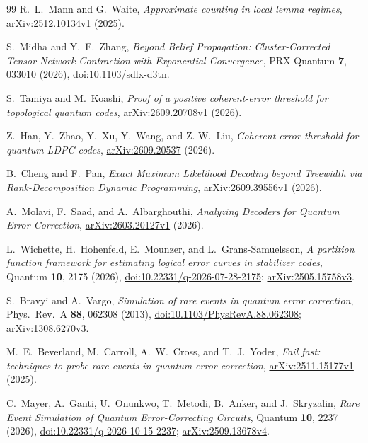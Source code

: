 \documentclass[10pt,twocolumn]{article}
\theoremstyle{definition}
\begin{document}
\begin{thebibliography}{99}
R.~L.~Mann and G.~Waite,
\emph{Approximate counting in local lemma regimes},
\href{https://arxiv.org/abs/2512.10134v1}{arXiv:2512.10134v1} (2025).

S.~Midha and Y.~F.~Zhang,
\emph{Beyond Belief Propagation: Cluster-Corrected Tensor Network Contraction
with Exponential Convergence}, PRX Quantum \textbf{7}, 033010 (2026),
\href{https://doi.org/10.1103/sdlx-d3tn}{doi:10.1103/sdlx-d3tn}.

S.~Tamiya and M.~Koashi,
\emph{Proof of a positive coherent-error threshold for topological quantum codes},
\href{https://arxiv.org/abs/2609.20708v1}{arXiv:2609.20708v1} (2026).

Z.~Han, Y.~Zhao, Y.~Xu, Y.~Wang, and Z.-W.~Liu,
\emph{Coherent error threshold for quantum LDPC codes},
\href{https://arxiv.org/abs/2609.20537}{arXiv:2609.20537} (2026).

B.~Cheng and F.~Pan,
\emph{Exact Maximum Likelihood Decoding beyond Treewidth via
Rank-Decomposition Dynamic Programming},
\href{https://arxiv.org/abs/2609.39556v1}{arXiv:2609.39556v1} (2026).

A.~Molavi, F.~Saad, and A.~Albarghouthi,
\emph{Analyzing Decoders for Quantum Error Correction},
\href{https://arxiv.org/abs/2603.20127v1}{arXiv:2603.20127v1} (2026).

L.~Wichette, H.~Hohenfeld, E.~Mounzer, and L.~Grans-Samuelsson,
\emph{A partition function framework for estimating logical error curves
in stabilizer codes},
Quantum \textbf{10}, 2175 (2026),
\href{https://doi.org/10.22331/q-2026-07-28-2175}{doi:10.22331/q-2026-07-28-2175};
\href{https://arxiv.org/abs/2505.15758v3}{arXiv:2505.15758v3}.

S.~Bravyi and A.~Vargo,
\emph{Simulation of rare events in quantum error correction},
Phys.\ Rev.\ A \textbf{88}, 062308 (2013),
\href{https://doi.org/10.1103/PhysRevA.88.062308}{doi:10.1103/PhysRevA.88.062308};
\href{https://arxiv.org/abs/1308.6270v3}{arXiv:1308.6270v3}.

M.~E.~Beverland, M.~Carroll, A.~W.~Cross, and T.~J.~Yoder,
\emph{Fail fast: techniques to probe rare events in quantum error correction},
\href{https://arxiv.org/abs/2511.15177v1}{arXiv:2511.15177v1} (2025).

C.~Mayer, A.~Ganti, U.~Onunkwo, T.~Metodi, B.~Anker, and J.~Skryzalin,
\emph{Rare Event Simulation of Quantum Error-Correcting Circuits},
Quantum \textbf{10}, 2237 (2026),
\href{https://doi.org/10.22331/q-2026-10-15-2237}{doi:10.22331/q-2026-10-15-2237};
\href{https://arxiv.org/abs/2509.13678v4}{arXiv:2509.13678v4}.


\end{thebibliography}
\end{document}
